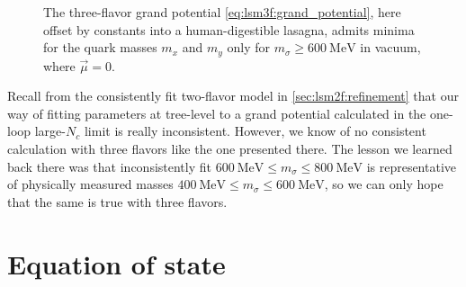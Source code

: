 \begin{figure}
\caption{\label{fig:lsm3f:potential_sigma_mass}%
The three-flavor grand potential \eqref{eq:lsm3f:grand_potential},
here offset by constants into a human-digestible lasagna,
admits minima for the quark masses $m_x$ and $m_y$ only for $m_\sigma \geq \SI{600}{\mega\electronvolt}$
in vacuum, where $\vec{\mu}=0$.
}
\end{figure}

Recall from the consistently fit two-flavor model in \cref{sec:lsm2f:refinement}
that our way of fitting parameters at tree-level to a grand potential calculated in the one-loop large-$N_c$ limit is really inconsistent.
However, we know of no consistent calculation with three flavors like the one presented there.
The lesson we learned back there was that inconsistently fit $\SI{600}{\mega\electronvolt} \leq m_\sigma \leq \SI{800}{\mega\electronvolt}$
is representative of physically measured masses $\SI{400}{\mega\electronvolt} \leq m_\sigma \leq \SI{600}{\mega\electronvolt}$,
so we can only hope that the same is true with three flavors.

\section{Equation of state}

